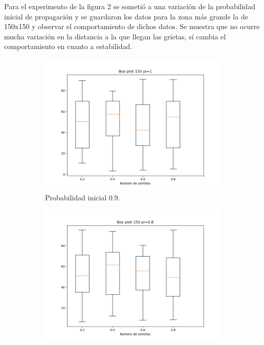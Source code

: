 \documentclass{article}
\begin{document}
Para el experimento de la figura 2 se sometió a una variación de la probabilidad inicial de propagación y se guardaron los datos para la zona más grande la de 150x150 y observar el comportamiento de dichos datos. Se muestra que no ocurre mucha variación en la distancia a la que llegan las grietas, sí cambia el comportamiento en cuanto a estabilidad.

\begin{figure}
	\centering
	\begin{subfigure}[b]{0.45\linewidth}
		\includegraphics[width=\linewidth]{Figp1.png}
		\caption{Probabilidad inicial 0.9.}
		\label{09}
	\end{subfigure}
		\begin{subfigure}[b]{0.45\linewidth}
			\includegraphics[width=\linewidth]{Figp8.png}

\end{subfigure}
\end{figure}
\end{document}
